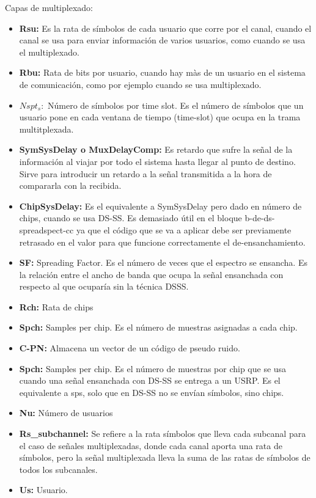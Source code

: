 Capas de multiplexado:
\begin{itemize}
	\item  \textbf{Rsu:} Es la rata de símbolos de cada usuario que corre por el canal, cuando el canal se usa para enviar información de varios usuarios, como cuando se usa el multiplexado.
	\item  \textbf{Rbu:} Rata de bits por usuario, cuando hay màs de un usuario en el sistema de comunicación, como por ejemplo cuando se usa multiplexado.
	\item  \textbf{$Nspt_s:$} Número de símbolos por time slot. Es el número de símbolos que un usuario pone en cada ventana de tiempo (time-slot) que ocupa en la trama multitplexada.
	\item  \textbf{SymSysDelay o MuxDelayComp:} Es retardo que sufre la señal de la información al viajar por todo el sistema hasta llegar al punto de destino. Sirve para introducir un retardo a la señal transmitida a la hora de compararla con la recibida.
	\item  \textbf{ChipSysDelay:} Es el equivalente a SymSysDelay pero dado en número de chips, cuando se usa DS-SS. Es demasiado útil en el bloque b-de-ds-spreadspect-cc ya que el código que se va a aplicar debe ser previamente retrasado en el valor para que funcione correctamente el de-ensanchamiento.   
	\item  \textbf{SF:} Spreading Factor. Es el número de veces que el espectro se ensancha. Es la relación entre el ancho de banda que ocupa la señal ensanchada con respecto al que ocuparía sin la técnica DSSS.
	\item  \textbf{Rch:} Rata de chips
	\item  \textbf{Spch:} Samples per chip. Es el número de muestras asignadas a cada chip.
	\item  \textbf{C-PN:} Almacena un vector de un código de pseudo ruido.
	\item  \textbf{Spch:} Samples per chip. Es el número de muestras por chip que se usa cuando una señal ensanchada con DS-SS se entrega a un USRP. Es el equivalente a sps, solo que en DS-SS no se envían símbolos, sino chips.
	\item  \textbf{Nu:} Número de usuarios 
	\item  \textbf{Rs\_subchannel:} Se refiere a la rata símbolos que lleva cada subcanal para el caso de señales multiplexadas, donde cada canal aporta una rata de símbolos, pero la señal multiplexada lleva la suma de las ratas de símbolos de todos los subcanales.
	\item  \textbf{Us:} Usuario.
\end{itemize}


